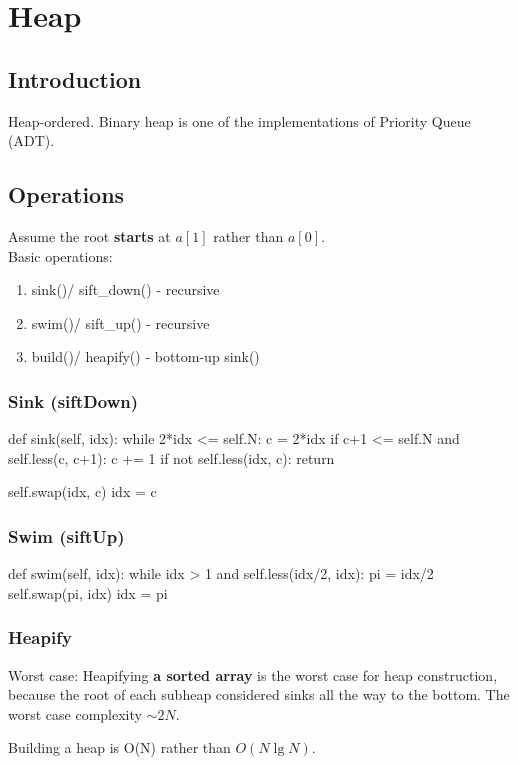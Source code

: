 \chapter{Heap}

\section{Introduction}
Heap-ordered. Binary heap is one of the implementations of Priority Queue (ADT). 

\section{Operations}
Assume the root \textbf{starts} at $a[1]$ rather than $a[0]$.
\\
Basic operations:
\begin{enumerate}
\item sink()/ sift\_down() - recursive
\item swim()/ sift\_up() - recursive
\item build()/ heapify() - bottom-up sink()
\end{enumerate}
\subsection{Sink (siftDown)}
\begin{python}
def sink(self, idx):
    while 2*idx <= self.N:
        c = 2*idx
        if c+1 <= self.N and self.less(c, c+1):
            c += 1
        if not self.less(idx, c):
            return 

        self.swap(idx, c)
        idx = c
\end{python}
\subsection{Swim (siftUp)}
\begin{python}
def swim(self, idx):
    while idx > 1 and self.less(idx/2, idx):
        pi = idx/2
        self.swap(pi, idx)
        idx = pi
\end{python}
\subsection{Heapify}
Worst case: Heapifying \textbf{a sorted array} is the worst case for heap construction, because the root of each subheap considered sinks all the way to the bottom. The worst case complexity $\sim 2N$.

Building a heap is O(N) rather than $O(N \lg N)$.

